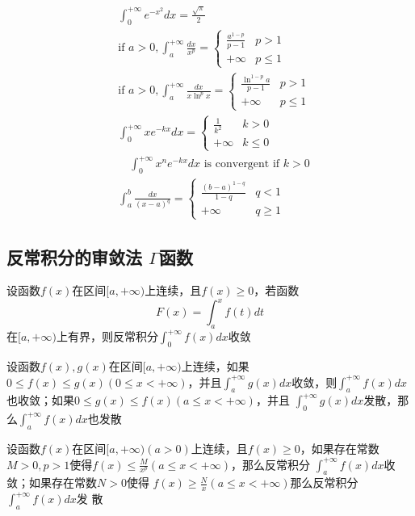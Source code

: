 \documentclass[11pt]{article}
\begin{document}
\begin{align*}
&\int_{0}^{+\infty}e^{-x^2}dx=\frac{\sqrt{\pi}}{2}\\
&\text{if }a>0,\int_a^{+\infty}\frac{dx}{x^p}=\begin{cases}\frac{a^{1-p}}{p-1}&p>1\\+\infty&p\le1\end{cases}\\
&\text{if }a>0,\int_a^{+\infty}\frac{dx}{x\ln^px}=
\begin{cases}
\frac{\ln^{1-p}a}{p-1}&p>1\\
+\infty&p\le1
\end{cases}\\
&\int_0^{+\infty}xe^{-kx}dx=
\begin{cases}
\frac{1}{k^2}&k>0\\
+\infty&k\le0
\end{cases}\\
&\quad\int_0^{+\infty}x^ne^{-kx}dx\text{ is convergent if }k>0\\
&\int_a^b\frac{dx}{(x-a)^q}=
\begin{cases}
\frac{(b-a)^{1-q}}{1-q}&q<1\\
+\infty&q\ge1
\end{cases}
\end{align*}
\subsection{反常积分的审敛法 \(Γ\)函数}
\label{sec:org6b4ee64}
\begin{theorem}[]
设函数\(f(x)\)在区间\([a,+\infty)\)上连续，且\(f(x)\ge0\)，若函数
\begin{equation*}
F(x)=\int_a^xf(t)dt
\end{equation*}
在\([a,+\infty)\)上有界，则反常积分\(\int_0^{+\infty}f(x)dx\)收敛
\end{theorem}

\begin{theorem}[比较审敛原理]
设函数\(f(x),g(x)\)在区间\([a,+\infty)\)上连续，如果\(0\le f(x)\le g(x)(0\le
   x<+\infty)\)，并且\(\int_a^{+\infty}g(x)dx\)收敛，则\(\int_a^{+\infty}f(x)dx\)
也收敛；如果\(0\le g(x)\le f(x)(a\le x<+\infty)\)，并且
\(\int_0^{+\infty}g(x)dx\)发散，那么\(\int_a^{+\infty}f(x)dx\)也发散
\end{theorem}

\begin{theorem}[比较审敛法 1]
设函数\(f(x)\)在区间\([a,+\infty)(a>0)\)上连续，且\(f(x)\ge0\)，如果存在常数
\(M>0,p>1\)使得\(f(x)\le\frac{M}{x^p}(a\le x<+\infty)\)，那么反常积分
\(\int_a^{+\infty}f(x)dx\)收敛；如果存在常数\(N>0\)使得
\(f(x)\ge\frac{N}{x}(a\le x<+\infty)\)那么反常积分\(\int_a^{+\infty}f(x)dx\)发
散
\end{theorem}
\end{document}
